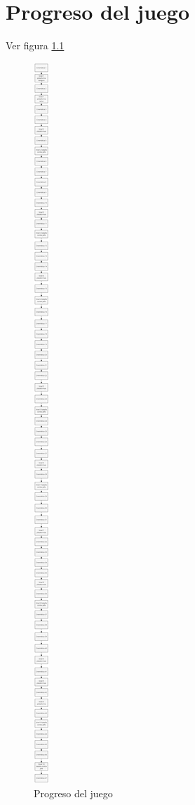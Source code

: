 \chapter{Progreso del juego}
Ver figura \ref{fig:ProgJuego}
\begin{figure}
  \centering
     \includegraphics[width=0.1\linewidth]{Imagenes/DiagramaFlujo}
  \caption{Progreso del juego}
  \label{fig:ProgJuego}
\end{figure} 